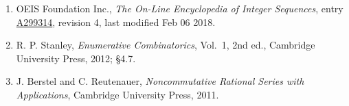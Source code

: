 \documentclass[11pt]{article}
\theoremstyle{definition}
\begin{document}
\begin{enumerate}

\item OEIS Foundation Inc., \emph{The On-Line Encyclopedia of Integer Sequences}, entry \href{https://oeis.org/A299314}{A299314}, revision 4, last modified Feb 06 2018.

\item R. P. Stanley, \emph{Enumerative Combinatorics}, Vol.~1, 2nd ed., Cambridge University Press, 2012; \S4.7.

\item J. Berstel and C. Reutenauer, \emph{Noncommutative Rational Series with Applications}, Cambridge University Press, 2011.

\end{enumerate}
\end{document}
